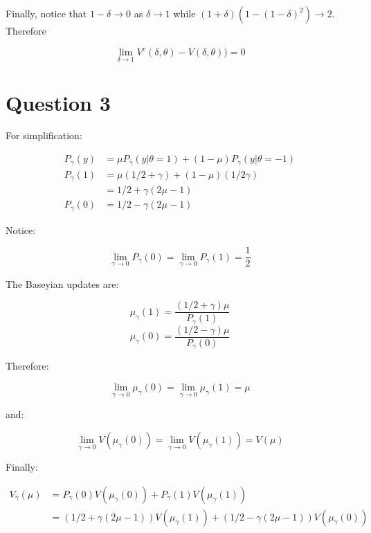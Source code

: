 \documentclass{article}
\begin{document}
Finally, notice that $1 - \delta \to 0$ as $\delta \to 1$ while
$(1 + \delta)(1 - (1 - \delta)^2) \to 2$. Therefore

\[
  \lim_{\delta \to 1} V^c(\delta, \theta) - V(\delta, \theta)) = 0
\]



\section{Question 3}%
\label{sec:Question 3}

For simplification:

\[
\begin{split}
  P_{\gamma}(y) & = \mu P_{\gamma}(y| \theta = 1) + (1 - \mu)P_{\gamma}(y|\theta = -1) \\
  P_{\gamma}(1) & = \mu (1/2 + \gamma) + (1 - \mu)(1/2 \gamma) \\
                & = 1/2 + \gamma(2\mu - 1) \\
  P_{\gamma}(0) & = 1/2 - \gamma(2\mu - 1)
\end{split}
\]

Notice:

\[
  \lim_{\gamma \to 0} P_{\gamma}(0) = \lim_{\gamma \to 0} P_{\gamma}(1) = \frac{1}{2}
\]

The Baseyian updates are:

\[
  \mu_\gamma(1) = \frac{(1/2 + \gamma)\mu}{P_\gamma(1)}
\]
\[
  \mu_\gamma(0) = \frac{(1/2 - \gamma)\mu}{P_\gamma(0)}
\]

Therefore:

\[
  \lim_{\gamma \to 0} \mu_\gamma(0) = \lim_{\gamma \to 0} \mu_\gamma(1) = \mu
\]

and:

\[
  \lim_{\gamma \to 0} V(\mu_\gamma(0)) = \lim_{\gamma \to 0} V(\mu_\gamma(1)) = V(\mu)
\]



Finally:

\[
\begin{split}
  V_\gamma(\mu) & = P_\gamma(0)V(\mu_\gamma(0)) + P_\gamma(1)V(\mu_\gamma(1)) \\
                & = (1/2 + \gamma(2\mu -1))V(\mu_\gamma(1)) +
                    (1/2 - \gamma(2\mu -1))V(\mu_\gamma(0))
\end{split}
\]
\end{document}
